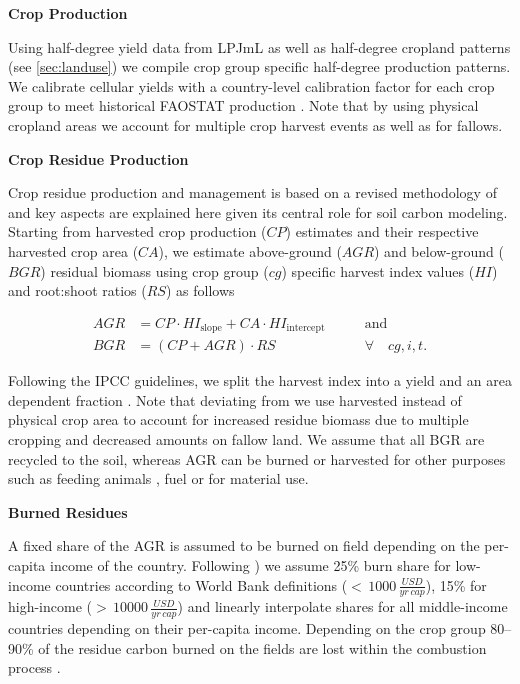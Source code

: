 \documentclass[gc, manuscript]{copernicus}
\begin{document}
\textbf{Crop Production}

Using half-degree yield data from LPJmL \citep{schaphoff_lpjml4_2018} as well as half-degree cropland patterns (see \ref{sec:landuse}) we compile crop group specific half-degree production patterns. We calibrate cellular yields with a country-level calibration factor for each crop group to meet historical FAOSTAT production \citep{faostat_faostat_2016}. Note that by using physical cropland areas we account for multiple crop harvest events as well as for fallows.

\textbf{Crop Residue Production}

Crop residue production and management is based on a revised methodology of \citep{bodirsky_n2o_2012} and key aspects are explained here given its central role for soil carbon modeling. Starting from harvested crop production (\(CP\)) estimates and their respective harvested crop area (\(CA\)), we estimate above-ground (\(AGR\)) and below-ground (\(BGR\)) residual biomass using crop group (\(cg\)) specific harvest index values (\(HI\)) and root:shoot ratios (\(RS\)) as follows

\begin{equation}
\begin{aligned}
AGR & = CP \cdot HI_{\textrm{slope}} + CA \cdot HI_{\textrm{intercept}}\qquad & \textrm{and} \\
BGR & = (CP + AGR) \cdot RS \qquad                                            & \forall\quad cg, i, t.
\label{eq:resbiomass}
\end{aligned}
\end{equation}

Following the IPCC guidelines, we split the harvest index into a yield and an area dependent fraction \citep{ipcc_2006_2006}. Note that deviating from \citep{bodirsky_n2o_2012} we use harvested instead of physical crop area to account for increased residue biomass due to multiple cropping and decreased amounts on fallow land.
We assume that all BGR are recycled to the soil, whereas AGR can be burned or harvested for other purposes such as feeding animals \citep{weindl_livestock_2017}, fuel or for material use.

\textbf{Burned Residues}

A fixed share of the AGR is assumed to be burned on field depending on the per-capita income of the country. Following \citep{smil_nitrogen_1999}) we assume 25\% burn share for low-income countries according to World Bank definitions (\(<\,1000\,\tfrac{USD}{yr\,cap}\)), 15\% for high-income (\(>\,10000\,\tfrac{USD}{yr\,cap}\)) and linearly interpolate shares for all middle-income countries depending on their per-capita income. Depending on the crop group 80--90\% of the residue carbon burned on the fields are lost within the combustion process \citep{ipcc_2006_2006}.
\end{document}
